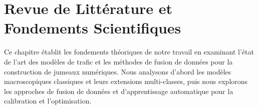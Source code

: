 \chapter{Revue de Littérature et Fondements Scientifiques}
\label{chap:revue_litterature}

Ce chapitre établit les fondements théoriques de notre travail en examinant l'état de l'art des modèles de trafic et les méthodes de fusion de données pour la construction de jumeaux numériques. Nous analysons d'abord les modèles macroscopiques classiques et leurs extensions multi-classes, puis nous explorons les approches de fusion de données et d'apprentissage automatique pour la calibration et l'optimisation.



